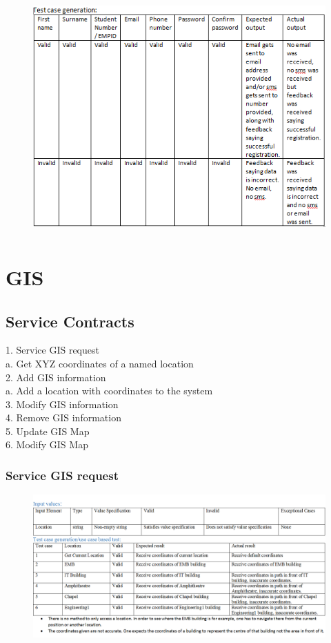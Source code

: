 \documentclass[english]{article}
\begin{document}
\begin{figure}[H]
\hspace*{-2.5cm}
\includegraphics[width=180mm,height=90mm]{NotificationsTest.png}
\end{figure}
\section{GIS}
\subsection{Service Contracts}
1.	Service GIS request\\
	a.	Get XYZ coordinates of a named location\\
2.	Add GIS information\\
	a.	Add a location with coordinates to the system\\
3.	Modify GIS information\\
4.	Remove GIS information\\
5.	Update GIS Map\\
6.	Modify GIS Map\\
\subsubsection{Service GIS request}
\begin{figure}[ht!]
\hspace*{-2.5cm}
\includegraphics[width=180mm]{ServiceGISReq.png}
\end{figure}
\end{document}
